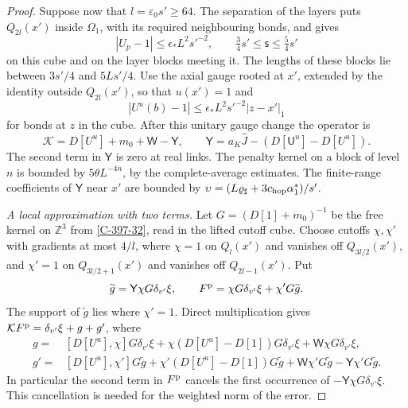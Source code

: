 \documentclass[11pt,letterpaper,reqno]{amsart}
\theoremstyle{definition}
\theoremstyle{remark}
\begin{document}
\begin{proof}
Suppose now that $l=\varepsilon_0s'\ge64$.
The separation of the layers puts $Q_{2l}(x')$ inside
$\Omega_1$, with its required neighbouring bonds, and gives
\[
 |U_p-1|\le\epsilon_*L^2s'^{-2},\qquad
 \tfrac34s'\le\mathsf s\le\tfrac54s'
\]
on this cube and on the layer blocks meeting it. The lengths
of these blocks lie between $3s'/4$ and $5Ls'/4$.
Use the axial gauge rooted at $x'$, extended by the identity
outside $Q_{2l}(x')$, so that $u(x')=1$ and
\[
 |U^u(b)-1|\le\epsilon_*L^2s'^{-2}|z-x'|_1
\]
for bonds at $z$ in the cube. After this unitary gauge change
the operator is
\[
 \mathcal K=D[U^u]+m_0+\mathsf W-\mathsf Y,
 \qquad
 \mathsf Y=a_K\widehat J-(D[\mathsf U^u]-D[U^u]).
\]
The second term in $\mathsf Y$ is zero at real links.
The penalty kernel on a block of level $n$ is bounded by
$5\theta L^{-4n}$, by the complete-average estimates.
The finite-range coefficients of $\mathsf Y$ near $x'$ are
bounded by
$\upsilon=(L\varrho_\sharp+3c_{\rm hop}\alpha_1^*)/s'$.

\emph{A local approximation with two terms.}
Let $G=(D[1]+m_0)^{-1}$ be the free kernel on $\mathbb Z^3$
from \cref{C-397-32}, read in the lifted cutoff cube.
Choose cutoffs $\chi,\chi'$ with gradients
at most $4/l$, where $\chi=1$ on $Q_l(x')$ and vanishes
off $Q_{3l/2}(x')$, and $\chi'=1$ on $Q_{3l/2+1}(x')$
and vanishes off $Q_{2l-1}(x')$. Put
\[
 \widetilde g=\mathsf Y\chi G\delta_{v'}\xi,
 \qquad F^{\rm p}=\chi G\delta_{v'}\xi+\chi'G\widetilde g.
\]
The support of $\widetilde g$ lies where $\chi'=1$.
Direct multiplication gives
$\mathcal KF^{\rm p}=\delta_{v'}\xi+g+g'$, where
\[
 \begin{split}
 g={}&[D[U^u],\chi]G\delta_{v'}\xi
       +\chi(D[U^u]-D[1])G\delta_{v'}\xi
       +\mathsf W\chi G\delta_{v'}\xi,\\
 g'={}&[D[U^u],\chi']G\widetilde g
       +\chi'(D[U^u]-D[1])G\widetilde g
       +\mathsf W\chi'G\widetilde g
       -\mathsf Y\chi'G\widetilde g.
 \end{split}
\]
In particular the second term in $F^{\rm p}$ cancels the
first occurrence of $-\mathsf Y\chi G\delta_{v'}\xi$.
This cancellation is needed for the weighted norm of the error.


\end{proof}
\end{document}
